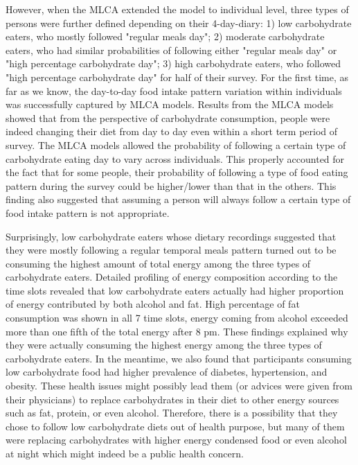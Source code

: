 However, when the MLCA extended the model to individual level, three types of persons were further defined depending on their 4-day-diary: 1) low carbohydrate eaters, who mostly followed "regular meals day"; 2) moderate carbohydrate eaters, who had similar probabilities of following either "regular meals day" or "high percentage carbohydrate day"; 3) high carbohydrate eaters, who followed "high percentage carbohydrate day" for half of their survey. For the first time, as far as we know, the day-to-day food intake pattern variation within individuals was successfully captured by MLCA models. Results from the MLCA models showed that from the perspective of carbohydrate consumption, people were indeed changing their diet from day to day even within a short term period of survey. The MLCA models allowed the probability of following a certain type of carbohydrate eating day to vary across individuals. This properly accounted for the fact that for some people, their probability of following a type of food eating pattern during the survey could be higher/lower than that in the others. This finding also suggested that assuming a person will always follow a certain type of food intake pattern is not appropriate.

Surprisingly, low carbohydrate eaters whose dietary recordings suggested that they were mostly following a regular temporal meals pattern turned out to be consuming the highest amount of total energy among the three types of carbohydrate eaters. Detailed profiling of energy composition according to the time slots revealed that low carbohydrate eaters actually had higher proportion of energy contributed by both alcohol and fat. High percentage of fat consumption was shown in all 7 time slots, energy coming from alcohol exceeded more than one fifth of the total energy after 8 pm. These findings explained why they were actually consuming the highest energy among the three types of carbohydrate eaters. In the meantime, we also found that participants consuming low carbohydrate food had higher prevalence of diabetes, hypertension, and obesity. These health issues might possibly lead them (or advices were given from their physicians) to replace carbohydrates in their diet to other energy sources such as fat, protein, or even alcohol. Therefore, there is a possibility that they chose to follow low carbohydrate diets out of health purpose, but many of them were replacing carbohydrates with higher energy condensed food or even alcohol at night which might indeed be a public health concern. 

